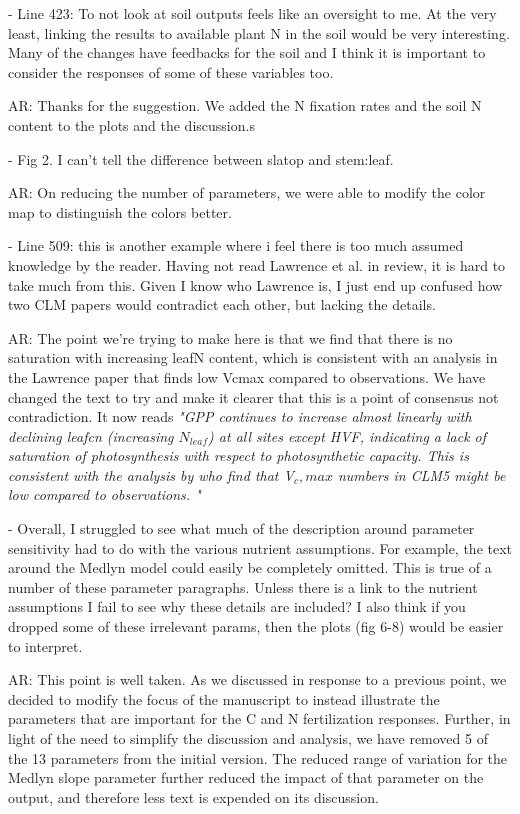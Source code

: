 \documentclass{article}
\begin{document}
- Line 423: To not look at soil outputs feels like an oversight to me. At the very least, linking the results to available plant N in the soil would be very interesting. Many of the changes have feedbacks for the soil and I think it is important to consider the responses of some of these variables too. 

\textsf{AR: Thanks for the suggestion. We added the N fixation rates and the soil N content to the plots and the discussion.s}

- Fig 2. I can't tell the difference between slatop and stem:leaf. 

\textsf{AR: On reducing the number of parameters,  we were able to modify the color map to distinguish the colors better.}

- Line 509: this is another example where i feel there is too much assumed knowledge by the reader. Having not read Lawrence et al. in review, it is hard to take much from this. Given I know who Lawrence is, I just end up confused how two CLM papers would contradict each other, but lacking the details. 

\textsf{AR: The point we're trying to make here is that we find that there is no saturation with increasing leafN content, which is consistent with an analysis in the Lawrence paper that finds low Vcmax compared to observations. We have changed the text to try and make it clearer that this is a point of consensus not contradiction. It now reads \emph{"GPP continues to increase almost linearly with declining \emph{leafcn}  (increasing $N_{leaf}$) at all sites except HVF, indicating a lack of saturation of photosynthesis with respect to photosynthetic capacity.  This is consistent with the analysis by \cite{lawrence2018} who find that V${_c,max}$ numbers in CLM5 might be low compared to observations. "}}

- Overall, I struggled to see what much of the description around parameter sensitivity had to do with the various nutrient assumptions. For example, the text around the Medlyn model could easily be completely omitted. This is true of a number of these parameter paragraphs. Unless there is a link to the nutrient assumptions I fail to see why these details are included? I also think if you dropped some of these irrelevant params, then the plots (fig 6-8) would be easier to interpret.

\textsf{AR: This point is well taken. As we discussed in response to a previous point, we decided to modify the focus of the manuscript to instead illustrate the parameters that are important for the C and N fertilization responses. Further, in light of the need to simplify the discussion and analysis, we have removed 5 of the 13 parameters from the initial version. The reduced range of variation for the Medlyn slope parameter further reduced the impact of that parameter on the output, and therefore less text is expended on its discussion.}
\end{document}
